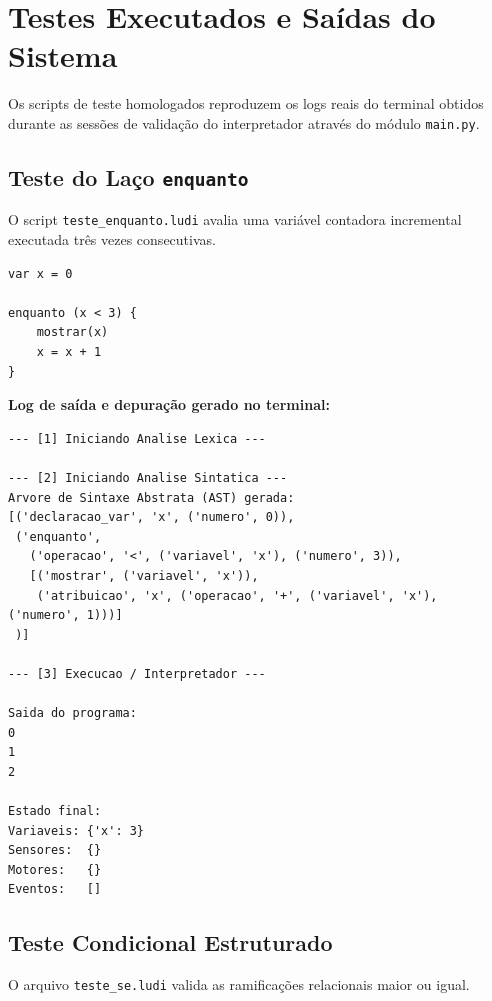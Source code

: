 \documentclass[12pt,a4paper]{article}
\begin{document}
\section{Testes Executados e Saídas do Sistema}

Os scripts de teste homologados reproduzem os logs reais do terminal obtidos durante as sessões de validação do interpretador através do módulo \texttt{main.py}.

\subsection{Teste do Laço \texttt{enquanto}}

O script \texttt{teste\_enquanto.ludi} avalia uma variável contadora incremental executada três vezes consecutivas.

\begin{lstlisting}[caption={tests/teste\_enquanto.ludi}]
var x = 0

enquanto (x < 3) {
    mostrar(x)
    x = x + 1
}
\end{lstlisting}

\textbf{Log de saída e depuração gerado no terminal:}
\begin{lstlisting}[language={}, numbers=none, frame=single, caption={Saída do console para o laço enquanto}]
--- [1] Iniciando Analise Lexica ---

--- [2] Iniciando Analise Sintatica ---
Arvore de Sintaxe Abstrata (AST) gerada:
[('declaracao_var', 'x', ('numero', 0)),
 ('enquanto',
   ('operacao', '<', ('variavel', 'x'), ('numero', 3)),
   [('mostrar', ('variavel', 'x')),
    ('atribuicao', 'x', ('operacao', '+', ('variavel', 'x'), ('numero', 1)))]
 )]

--- [3] Execucao / Interpretador ---

Saida do programa:
0
1
2

Estado final:
Variaveis: {'x': 3}
Sensores:  {}
Motores:   {}
Eventos:   []
\end{lstlisting}

\subsection{Teste Condicional Estruturado}

O arquivo \texttt{teste\_se.ludi} valida as ramificações relacionais maior ou igual.
\end{document}
